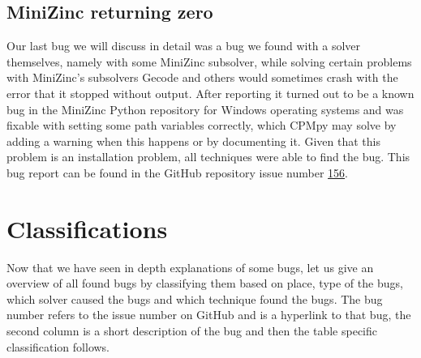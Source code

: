 \subsection{MiniZinc returning zero}
\label{res:bug:MinizincZero}
Our last bug we will discuss in detail was a bug we found with a solver themselves, namely with some MiniZinc subsolver, while solving certain problems with MiniZinc’s subsolvers Gecode and others would sometimes crash with the error that it stopped without output. After reporting it turned out to be a known bug in the MiniZinc Python repository for Windows operating systems and was fixable with setting some path variables correctly, which CPMpy may solve by adding a warning when this happens or by documenting it.
Given that this problem is an installation problem, all techniques were able to find the bug. This bug report can be found in the GitHub repository issue number \href{https://github.com/CPMpy/cpmpy/issues/156}{156}.

%
%





\section{Classifications}
\label{res:Classifications}
Now that we have seen in depth explanations of some bugs, let us give an overview of all found bugs by classifying them based on place, type of the bugs, which solver caused the bugs and which technique found the bugs. The bug number refers to the issue number on GitHub and is a hyperlink to that bug, the second column is a short description of the bug and then the table specific classification follows.

